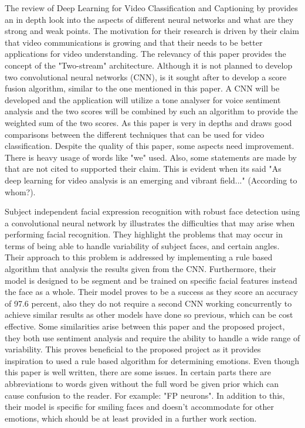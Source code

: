The review of Deep Learning for Video Classification and Captioning by \citeauthor{Wu} provides an in depth look into the aspects of different neural networks and what are they strong and weak points. The motivation for their research is driven by their claim that video communications is growing and that their needs to be better applications for video understanding. The relevancy of this paper provides the concept of the "Two-stream" architecture. Although it is not planned to develop two convolutional neural networks (CNN), is it sought after to develop a score fusion algorithm, similar to the one mentioned in this paper. A CNN will be developed and the application will utilize a tone analyser for voice sentiment analysis and the two scores will be combined by such an algorithm to provide
the weighted sum of the two scores. As this paper is very in depths and draws good comparisons between the different techniques that can be used for video classification. Despite the quality of this paper, some aspects need improvement. There is heavy usage of words like "we" used. Also, some statements are made by \citep{Wu} that are not cited to supported their claim. This is evident when its said "As deep learning for video analysis is an emerging and vibrant field..." (According to whom?).

Subject independent facial expression recognition with robust face detection using a convolutional neural network by \citeauthor{MATSUGU} illustrates the difficulties that may arise when performing facial recognition. They highlight the problems that may occur in terms of being able to handle variability of subject faces, and certain angles. Their approach to this problem is addressed by implementing a rule based algorithm that analysis the results given from the CNN. Furthermore, their model is designed to be segment and be trained on specific facial features instead the face as a whole. Their model proves to be a success as they score an accuracy of 97.6 percent, also they do not require a second CNN working concurrently to achieve similar results as other models have done so previous, which can be cost effective. Some similarities arise between this paper and the proposed project, they both use sentiment analysis and require the ability to handle a wide range of variability. This proves beneficial to the proposed project as it provides inspiration to used a rule based algorithm for determining emotions. Even though this paper is well written, there are some issues. In certain parts there are abbreviations to words given without the full word be given prior which can cause confusion to the reader. For example: "FP neurons". In addition to this, their model is specific for smiling faces and doesn't accommodate for other emotions, which should be at least provided in a further work section. 

